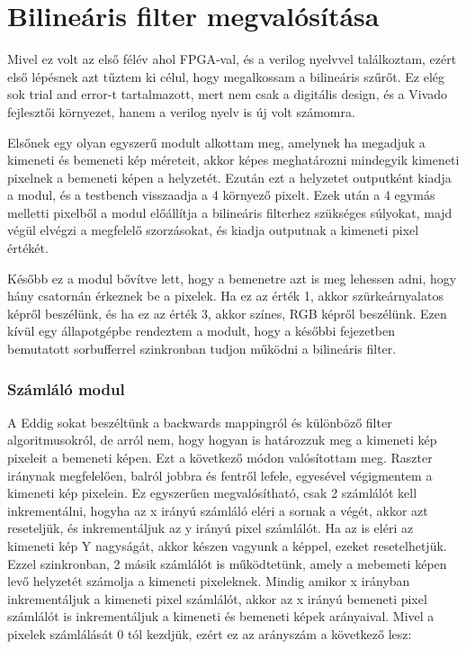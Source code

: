 \chapter{Bilineáris filter megvalósítása}

Mivel ez volt az első félév ahol FPGA-val, és a verilog nyelvvel találkoztam, ezért első lépésnek azt tűztem ki célul, hogy megalkossam a bilineáris szűrőt. Ez elég sok trial and error-t tartalmazott, mert nem csak a digitális design, és a Vivado fejlesztői környezet, hanem a verilog nyelv is új volt számomra. 

Elsőnek egy olyan egyszerű modult alkottam meg, amelynek ha megadjuk a kimeneti és bemeneti kép méreteit, akkor képes meghatározni mindegyik kimeneti pixelnek a bemeneti képen a helyzetét. Ezután ezt a helyzetet outputként kiadja a modul, és a testbench visszaadja a 4 környező pixelt. 
Ezek után a 4 egymás melletti pixelből a modul előállítja a bilineáris filterhez szükséges súlyokat, majd végül elvégzi a megfelelő szorzásokat, és kiadja outputnak a kimeneti pixel értékét. 

Később ez a modul bővítve lett, hogy a bemenetre azt is meg lehessen adni, hogy hány csatornán érkeznek be a pixelek. Ha ez az érték 1, akkor szürkeárnyalatos képről beszélünk, és ha ez az érték 3, akkor színes, RGB képről beszélünk.
Ezen kívül egy állapotgépbe rendeztem a modult, hogy a későbbi fejezetben bemutatott sorbufferrel szinkronban tudjon működni a bilineáris filter.

\subsection{Számláló modul}

A Eddig sokat beszéltünk a backwards mappingról és különböző filter algoritmusokról, de arról nem, hogy hogyan is határozzuk meg a kimeneti kép pixeleit a bemeneti képen. Ezt a következő módon valósítottam meg. Raszter iránynak megfelelően, balról jobbra és fentről lefele, egyesével végigmentem a kimeneti kép pixelein. Ez egyszerűen megvalósítható, csak 2 számlálót kell inkrementálni, hogyha az x irányú számláló eléri a sornak a végét, akkor azt reseteljük, és inkrementáljuk az y irányú pixel számlálót. Ha az is eléri az kimeneti kép Y nagyságát, akkor készen vagyunk a képpel, ezeket resetelhetjük. 
Ezzel szinkronban, 2 másik számlálót is működtetünk, amely a mebemeti képen levő helyzetét számolja a kimeneti pixeleknek. Mindig amikor x irányban inkrementáljuk a kimeneti pixel számlálót, akkor az x irányú bemeneti pixel számlálót is inkrementáljuk a kimeneti és bemeneti képek arányaival. Mivel a pixelek számlálását 0 tól kezdjük, ezért ez az arányszám a következő lesz:

